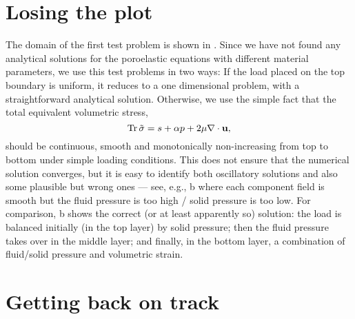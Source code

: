 \section{Losing the plot}

The domain of the first test problem is shown in .
Since we have not found any analytical solutions for the poroelastic equations
with different material parameters, we use this test problems in two ways: If
the load placed on the top boundary is uniform, it reduces to a one dimensional
problem, with a straightforward analytical solution.
Otherwise, we use the simple fact that the total equivalent volumetric stress,
\begin{equation}
\trace{\tilde{\sigma}} = s + \alpha p + 2\mu \nabla\cdot\U,
\end{equation}
should be continuous, smooth and monotonically non-increasing from top to bottom
under simple loading conditions.
This does not ensure that the numerical solution converges, but it is easy to
identify both oscillatory solutions and also some plausible but wrong ones
--- see, e.g., b where each component field is smooth
but the fluid pressure is too high / solid pressure is too low.
For comparison, b shows the correct (or at least
apparently so) solution: the load is balanced initially (in the top layer) by
solid pressure; then the fluid pressure takes over in the middle layer; and
finally, in the bottom layer, a combination of fluid/solid pressure and
volumetric strain.





\section{Getting back on track}

